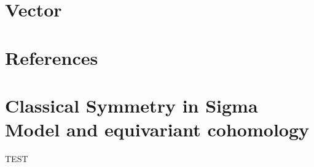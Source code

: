\documentclass[
  letterpaper,
  DIV=11,
  numbers=noendperiod]{scrreport}
\begin{document}

\chapter{Vector}\label{sec-vector}


\chapter*{References}\label{references}


\printbibliography[heading=none]

\cleardoublepage
{}
{}
\appendix

\chapter{Classical Symmetry in Sigma Model and equivariant
cohomology}\label{sec-equivariant}

TEST
\end{document}
